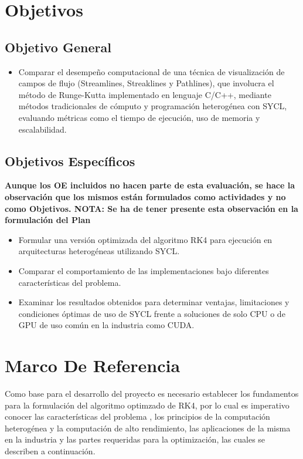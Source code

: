 \documentclass[12pt]{article}
\begin{document}
\section{Objetivos}
\subsection{Objetivo General}
\begin{itemize}

	\item Comparar el desempeño computacional de una técnica de visualización de campos de flujo (Streamlines, Streaklines y Pathlines), que involucra el método de Runge-Kutta implementado en lenguaje C/C++, mediante métodos tradicionales de cómputo y programación heterogénea con SYCL, evaluando métricas como el tiempo de ejecución, uso de memoria y escalabilidad.
\end{itemize}

\subsection{Objetivos Específicos}
\textbf{Aunque los OE incluidos no hacen parte de esta evaluación, se hace la observación que los mismos están formulados como actividades y no como Objetivos. NOTA: Se ha de tener presente esta observación en la formulación del Plan}
\begin{itemize}
	\item Formular una versión optimizada del algoritmo RK4 para ejecución en arquitecturas heterogéneas utilizando SYCL.
	\item Comparar el comportamiento de las implementaciones bajo diferentes características del problema.
	\item Examinar los resultados obtenidos para determinar ventajas, limitaciones y condiciones óptimas de uso de SYCL frente a soluciones de solo CPU o de GPU de uso común en la industria como CUDA.
\end{itemize}


\section{Marco De Referencia}

Como base para el desarrollo del proyecto es necesario establecer los fundamentos para la formulación del algoritmo optimzado de RK4, por lo cual es imperativo conocer las características del problema , los principios de la computación heterogénea y la computación de alto rendimiento, las aplicaciones de la misma en la industria y las partes requeridas para la optimización, las cuales se describen a continuación.
\end{document}
